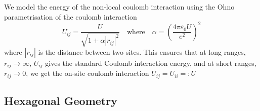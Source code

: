 We model the energy of the non-local coulomb interaction using the Ohno parametrisation of the coulomb interaction  \cite{ppp_ohno, hoerbinger}
\begin{equation}
    U_{ij} = \frac{U}{\sqrt{1 + \alpha |r_{ij}|^2}} \quad \text{where} \quad \alpha = \left(\frac{4\pi\varepsilon_0 U}{e^2} \right)^2 \label{eq:ohno_interpolation}
\end{equation}
where $|r_{ij}|$ is the distance between two sites. This ensures that at long ranges, $r_{ij}\to\infty$, $U_{ij}$ gives the standard Coulomb interaction energy, and at short ranges, $r_{ij}\to 0$, we get the on-site coulomb interaction $U_{ij} = U_{ii} =: U$ 

\subsection{Hexagonal Geometry}

